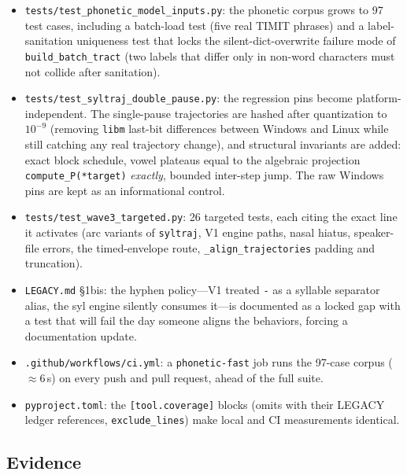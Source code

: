 \documentclass[11pt,a4paper]{article}
\newcommand{\code}[1]{\texttt{#1}}
\begin{document}
\begin{itemize}[leftmargin=1.4em, itemsep=0.15em]
  \item \code{tests/test\_phonetic\_model\_inputs.py}: the phonetic
        corpus grows to 97 test cases, including a batch-load test
        (five real TIMIT phrases) and a label-sanitation uniqueness
        test that locks the silent-dict-overwrite failure mode of
        \code{build\_batch\_tract} (two labels that differ only in
        non-word characters must not collide after sanitation).
  \item \code{tests/test\_syltraj\_double\_pause.py}: the regression
        pins become platform-independent. The single-pause
        trajectories are hashed after quantization to $10^{-9}$
        (removing \code{libm} last-bit differences between Windows
        and Linux while still catching any real trajectory change),
        and structural invariants are added: exact block schedule,
        vowel plateaus equal to the algebraic projection
        \code{compute\_P(*target)} \emph{exactly}, bounded inter-step
        jump. The raw Windows pins are kept as an informational
        control.
  \item \code{tests/test\_wave3\_targeted.py}: 26 targeted tests,
        each citing the exact line it activates (arc variants of
        \code{syltraj}, V1 engine paths, nasal hiatus, speaker-file
        errors, the timed-envelope route,
        \code{\_align\_trajectories} padding and truncation).
  \item \code{LEGACY.md} \S1bis: the hyphen policy---V1 treated
        \code{-} as a syllable separator alias, the syl engine
        silently consumes it---is documented as a locked gap with a
        test that will fail the day someone aligns the behaviors,
        forcing a documentation update.
  \item \code{.github/workflows/ci.yml}: a \code{phonetic-fast} job
        runs the 97-case corpus ($\approx$6\,s) on every push and
        pull request, ahead of the full suite.
  \item \code{pyproject.toml}: the \code{[tool.coverage]} blocks
        (omits with their LEGACY ledger references,
        \code{exclude\_lines}) make local and CI measurements
        identical.
\end{itemize}

\subsection{Evidence}
\end{document}
